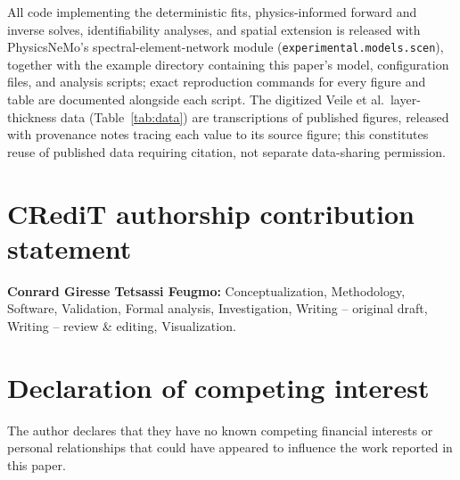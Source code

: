 \documentclass[preprint,12pt]{elsarticle}
\begin{document}
All code implementing the deterministic fits, physics-informed forward
and inverse solves, identifiability analyses, and spatial extension is
released with PhysicsNeMo's spectral-element-network module
(\texttt{experimental.\allowbreak models.\allowbreak scen}), together
with the example directory containing this paper's model, configuration
files, and analysis scripts; exact reproduction commands for every figure and
table are documented alongside each script. The digitized Veile et
al.\ layer-thickness data (Table~\ref{tab:data}) are transcriptions of
published figures, released with provenance notes tracing each value to
its source figure; this constitutes reuse of published data requiring
citation, not separate data-sharing permission.

\section*{CRediT authorship contribution statement}

\textbf{Conrard Giresse Tetsassi Feugmo:} Conceptualization,
Methodology, Software, Validation, Formal analysis, Investigation,
Writing -- original draft, Writing -- review \& editing, Visualization.

\section*{Declaration of competing interest}

The author declares that they have no known competing financial interests
or personal relationships that could have appeared to influence the work
reported in this paper.



\end{document}
